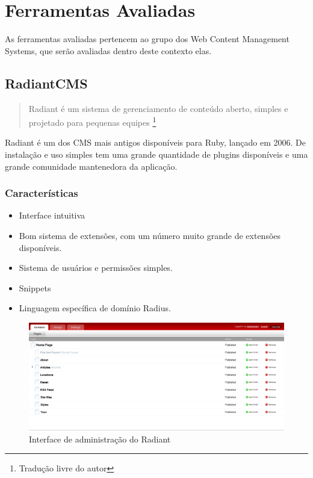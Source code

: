 \chapter{Ferramentas Avaliadas}

As ferramentas avaliadas pertencem ao grupo dos Web Content Management Systems, que serão avaliadas dentro deste contexto elas.

\section{RadiantCMS}

\begin{quote}
Radiant é um sistema de gerenciamento de conteúdo aberto, simples e projetado para pequenas equipes
\cite{radiant_website}\footnote{Tradução livre do autor}
\end{quote}

Radiant é um dos CMS mais antigos disponíveis para Ruby, lançado em 2006. De instalação e uso simples tem uma grande quantidade de plugins disponíveis e uma grande comunidade mantenedora da aplicação.

\subsection{Características}

\begin{itemize}
  \item Interface intuitiva
  \item Bom sistema de extensões, com um número muito grande de extensões disponíveis.
  \item Sistema de usuários e permissões simples.
  \item Snippets
  \item Linguagem específica de domínio Radius.
\end{itemize}

\begin{figure}[here]
\includegraphics[width=150mm]{images/radiant_admin.png}
\caption{Interface de administração do Radiant}
\label{fig:radiant_admin.png}
\end{figure}

